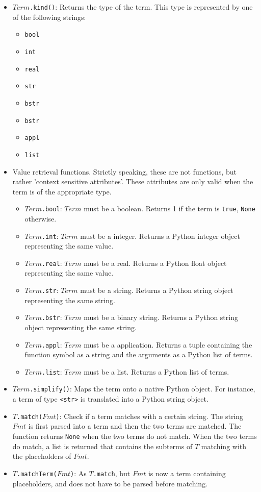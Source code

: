 \begin{itemize}
\item {\tt $Term$.kind()}: Returns the type of the term. This type is
      represented by one of the following strings:
      \begin{itemize}
	\item {\tt bool}
	\item {\tt int}
	\item {\tt real}
	\item {\tt str}
	\item {\tt bstr}
	\item {\tt bstr}
	\item {\tt appl}
	\item {\tt list}
      \end{itemize}
\item Value retrieval functions. Strictly speaking, these are not
      functions, but rather 'context sensitive attributes'. These
      attributes are only valid when the term is of the appropriate type.
      \begin{itemize}
	\item {\tt $Term$.bool}: $Term$ must be a boolean. Returns 1 if the
	      term is {\tt true}, {\tt None} otherwise.
	\item {\tt $Term$.int}: $Term$ must be a integer. Returns a Python
	      integer object representing the same value.
	\item {\tt $Term$.real}: $Term$ must be a real. Returns a Python
	      float object representing the same value.
	\item {\tt $Term$.str}: $Term$ must be a string. Returns a Python
	      string object representing the same string.
	\item {\tt $Term$.bstr}: $Term$ must be a binary string. Returns
	      a Python string object representing the same string.
	\item {\tt $Term$.appl}: $Term$ must be a application. Returns a
	      tuple containing the function symbol as a string and the
	      arguments as a Python list of terms.
	\item {\tt $Term$.list}: $Term$ must be a list. Returns a
	      Python list of terms.
      \end{itemize}
\item {\tt $Term$.simplify()}: Maps the term onto a native Python object.
      For instance, a term of type {\tt <str>} is translated into a Python
      string object. 
\item {\tt $T$.match($Fmt$)}: Check if a term matches with a certain string.
      The string $Fmt$ is first parsed into a term and then the two terms
      are matched. The function returns {\tt None} when the two terms do not
      match. When the two terms do match, a list is returned that contains
      the subterms of $T$ matching with the placeholders of $Fmt$.
\item {\tt $T$.matchTerm($Fmt$)}: As {\tt $T$.match}, but $Fmt$ is now a
      term containing placeholders, and does not have to be parsed before
      matching.
\end{itemize}

